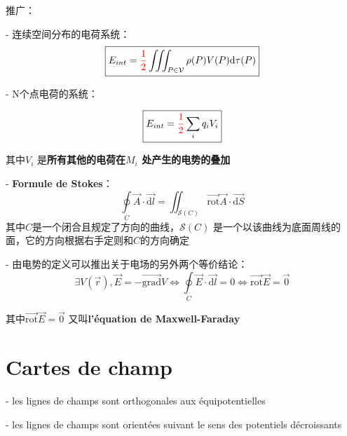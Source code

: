 \documentclass[12pt]{book}
\theoremstyle{definition}\newtheorem{dfn}{Définition}[chapter]
\theoremstyle{plain}\newtheorem{thm}{Théorème}[chapter]
\theoremstyle{plain}\newtheorem{prp}{Proposition}[chapter]
\theoremstyle{plain}\newtheorem{lem}{\bf Lemme}[chapter]
\theoremstyle{plain}\newtheorem{axm}{\bf Axiome}[chapter]
\theoremstyle{plain}\newtheorem{lmm}{\bf Lemme}[chapter]
\theoremstyle{plain}\newtheorem{cor}{\bf Corollaire}[chapter]
\theoremstyle{remark}\newtheorem{rem}{Remarque}[chapter]
\begin{document}
推广：

- 连续空间分布的电荷系统：
$$
\boxed{E_{int}={\color{red}\frac{1}{2}}\iiint_{P\in\mathcal{V}}\rho(P)V(P)\mathrm{d}\tau(P)}
$$

-  N个点电荷的系统：

$$
\boxed{E_{int}={\color{red}\frac{1}{2}}\sum\limits_{i}q_{i}V_{i}}
$$



其中$V_i$ 是{\bf 所有其他的电荷在$M_{i}$ 处产生的电势的叠加}        

- {\bf Formule de Stokes}：
$$
\boxed{\oint\limits_{C} \overrightarrow{A}\cdot\overrightarrow{\mathrm{d}l}=\iint_{\mathcal{S}(C)}\overrightarrow{\mathrm{rot}}\overrightarrow{A}\cdot\overrightarrow{\mathrm{d}S}}
$$
其中$C$是一个闭合且规定了方向的曲线，$\mathcal{S}(C)$ 是一个以该曲线为底面周线的面，它的方向根据右手定则和$C$的方向确定

- 由电势的定义可以推出关于电场的另外两个等价结论：
$$
\boxed{\exists V(\overrightarrow{r}),\overrightarrow{E}=-\overrightarrow{\mathrm{grad}}V\Leftrightarrow\oint\limits_{C} \overrightarrow{E}\cdot\overrightarrow{\mathrm{d}l}=0\Leftrightarrow \overrightarrow{\mathrm{rot}}\overrightarrow{E}=\overrightarrow{0}}
$$


其中$\boxed{\overrightarrow{\mathrm{rot}}\overrightarrow{E}=\overrightarrow{0}}$ 又叫{\bf l'équation de Maxwell-Faraday} 

\section{Cartes de champ}

- les lignes de champs sont orthogonales aux équipotentielles 

- les lignes de champs sont orientées suivant le sens des potentiels décroissants
\end{document}
